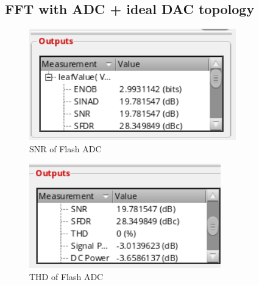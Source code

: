 \documentclass[a4paper,12pt]{article}
\begin{document}
\subsection{FFT with ADC + ideal DAC topology}

\begin{figure}[H]
    \centering
    \includegraphics[width=1\linewidth]{flash_SNR.png}
    \caption{SNR of Flash ADC}
    \label{fig:enter-label}
\end{figure}

\begin{figure}[H]
    \centering
    \includegraphics[width=1\linewidth]{flash_thd.png}
    \caption{THD of Flash ADC}
    \label{fig:enter-label}
\end{figure}
\end{document}
